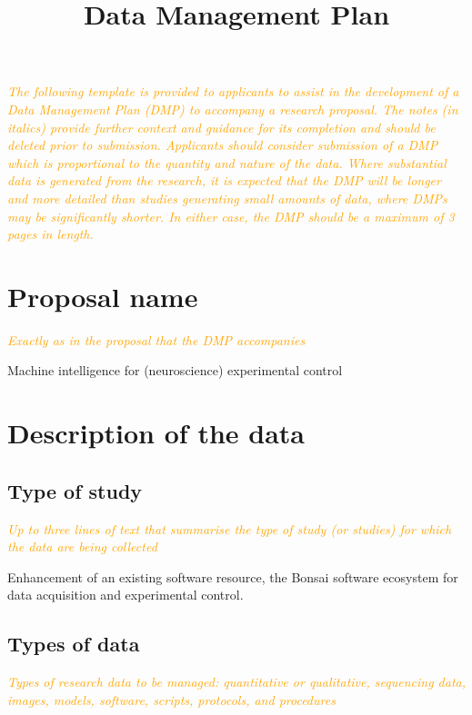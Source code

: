 \documentclass[a4paper,11pt]{article}
\title{Data Management Plan}
\author{}
\date{}
\begin{document}
\maketitle

\textcolor{orange}{\textit{The following template is provided to applicants to assist in the development of a Data Management Plan (DMP) to accompany a research proposal. The notes (in italics) provide further context and guidance for its completion and should be deleted prior to submission. Applicants should consider submission of a DMP which is proportional to the quantity and nature of the data. Where substantial data is generated from the research, it is expected that the DMP will be longer and more detailed than studies generating small amounts of data, where DMPs may be significantly shorter. In either case, the DMP should be a maximum of 3 pages in length.}}

\setcounter{section}{-1}

\section{Proposal name}

\textcolor{orange}{\textit{Exactly as in the proposal that the DMP accompanies}}

Machine intelligence for (neuroscience) experimental control

\section{Description of the data}
\subsection{Type of study}

\textcolor{orange}{\textit{Up to three lines of text that summarise the type of study (or studies) for which the data are being collected}}

Enhancement of an existing software resource, the Bonsai software
ecosystem for data acquisition and experimental control.

\subsection{Types of data}

\textcolor{orange}{\textit{Types of research data to be managed: quantitative or
qualitative, sequencing data, images, models, software, scripts, protocols, and
procedures}}
\end{document}
